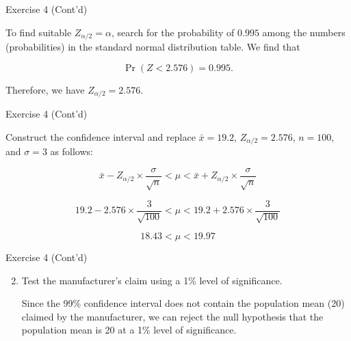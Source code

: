 \documentclass[
  ignorenonframetext,
  aspectratio=43,
]{beamer}
\let\olditem\item
\renewcommand\item{\olditem\justifying}
\begin{document}
\begin{frame}{Exercise 4 (Cont'd)}
\protect\hypertarget{exercise-4-contd}{}
\pause

To find suitable \(Z_{\alpha/2} = \alpha\), search for the probability
of \(0.995\) among the numbers (probabilities) in the standard normal
distribution table. We find that \vspace{-10pt}

\pause

\[
\Pr(Z < 2.576) = 0.995.
\]

Therefore, we have \(Z_{\alpha/2} = 2.576\).
\end{frame}

\begin{frame}{Exercise 4 (Cont'd)}
\protect\hypertarget{exercise-4-contd-1}{}
\pause

Construct the confidence interval and replace \(\bar{x}=19.2\),
\(Z_{\alpha/2}=2.576\), \(n=100\), and \(\sigma=3\) as follows:

\pause

\[
\bar{x} - Z_{\alpha/2} \times \frac{\sigma}{\sqrt{n}}
< \mu <
\bar{x} + Z_{\alpha/2} \times \frac{\sigma}{\sqrt{n}}
\]

\pause

\[
19.2 - 2.576 \times \frac{3}{\sqrt{100}}
< \mu <
19.2 + 2.576 \times \frac{3}{\sqrt{100}}
\]

\pause

\[
18.43 < \mu < 19.97
\]
\end{frame}

\begin{frame}{Exercise 4 (Cont'd)}
\protect\hypertarget{exercise-4-contd-2}{}
\begin{enumerate}
\setcounter{enumi}{1}
\item
  Test the manufacturer's claim using a 1\% level of significance.

  \pause

  Since the 99\% confidence interval does not contain the population
  mean (20) claimed by the manufacturer, we can reject the null
  hypothesis that the population mean is 20 at a 1\% level of
  significance.
\end{enumerate}
\end{frame}
\end{document}
